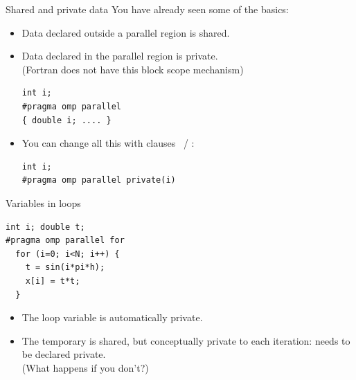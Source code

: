 
\begin{numberedframe}{Shared and private data}
  You have already seen some of the basics:
  \begin{itemize}
  \item Data declared outside a parallel region is shared.
  \item Data declared in the parallel region is private.\\
    (Fortran does not have this block scope mechanism)
\begin{lstlisting}
int i;
#pragma omp parallel 
{ double i; .... }
\end{lstlisting}
\item You can change all this with clauses
  ~/ :
\begin{lstlisting}
int i;
#pragma omp parallel private(i)
\end{lstlisting}
  \end{itemize}
\end{numberedframe}

\begin{numberedframe}{Variables in loops}
\begin{lstlisting}
int i; double t;
#pragma omp parallel for 
  for (i=0; i<N; i++) {
    t = sin(i*pi*h);
    x[i] = t*t;
  }
\end{lstlisting}
  \begin{itemize}
  \item The loop variable is automatically private.
  \item The temporary  is shared, but conceptually private to
    each iteration: needs to be declared private.\\
    (What happens if you don't?)
  \end{itemize}
\end{numberedframe}

